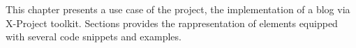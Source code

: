 This chapter presents a use case of the project, the implementation of a blog via X-Project toolkit.
Sections provides the rappresentation of elements equipped with several code snippets and examples.
